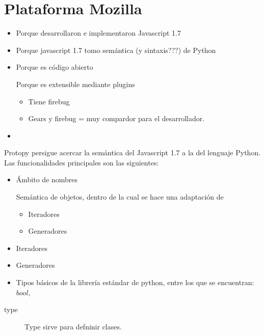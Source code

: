 \documentclass[a4paper]{report}
\begin{document}
\chapter{Plataforma Mozilla}
\begin{itemize}
  \item Porque desarrollaron e implementaron Javascript 1.7
  \item Porque javascript 1.7 tomo semántica (y sintaxis???) de Python
  \item Porque es código abierto
  \begin{item}
  	Porque es extensible mediante plugins
  	\begin{itemize}
        \item Tiene firebug
        \item Gears y firebug = muy compardor para el desarrollador.
     \end{itemize}
      
  \end{item}
  \item 
\end{itemize}

\label{ch:protopy}

Protopy persigue acercar la semántica del Javascript 1.7 a la del lenguaje
Python. Las funcionalidades principales son las siguientes:
\begin{itemize}
  \item Ámbito de nombres
  \begin{item}
  Semántica de objetos, dentro de la cual se hace una adaptación de
  \begin{itemize}
  	\item Iteradores
  	\item Generadores  
  \end{itemize}
  \end{item}
  
  
  \item Iteradores
  \item Generadores
  
  \item Tipos básicos de la librería estándar de python, entre los que se
  encuentran: $ bool, $
\end{itemize}


\begin{description}
\item[type]{
Type sirve para defninir clases.
}
\end{description}
\begin{thebibliography}{99}


\end{thebibliography}

\printglossary
\end{document}

